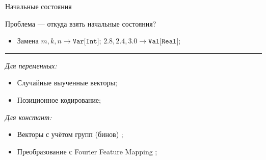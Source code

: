 \documentclass[14pt,aspectratio=169,hyperref={pdftex,unicode},xcolor=dvipsnames]{beamer}
\begin{document}
\begin{frame}{Начальные состояния}

Проблема --- откуда взять начальные состояния?

\begin{itemize}
  \item Замена $m, k, n \rightarrow \texttt{Var[Int]}$; $2.8, 2.4, 3.0 \rightarrow \texttt{Val[Real]}$;
\end{itemize}

\vspace{1mm}\hrule\vspace{1mm}

\begin{minipage}{0.5\textwidth}

\textit{Для переменных:}

\begin{itemize}
  \item Случайные выученные векторы;
  \item Позиционное кодирование;
\end{itemize}

\end{minipage}%
\begin{minipage}{0.5\textwidth}

\textit{Для констант:}

\begin{itemize}
  \item Векторы с учётом групп (бинов) \cite{embeddings-for-numerical-features-paper};
  \item Преобразование с Fourier Feature Mapping \cite{embeddings-for-numerical-features-paper};
\end{itemize}

\end{minipage}

\end{frame}
\end{document}
